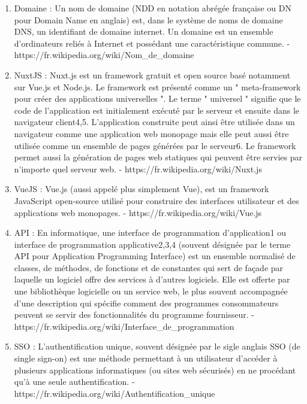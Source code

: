 \documentclass[12pt]{article}
\begin{document}
\begin {sloppypar}
\begin{enumerate}
    - https://fr.wikipedia.org/wiki/Google\_Cloud\_Platform
  \item 
    Domaine : Un nom de domaine (NDD en notation abrégée française ou DN pour Domain Name en anglais) est, dans le système de noms de domaine DNS, un identifiant de domaine internet. Un domaine est un ensemble d'ordinateurs reliés à Internet et possédant une caractéristique commune. 
    - https://fr.wikipedia.org/wiki/Nom\_de\_domaine
  \item 
    NuxtJS : Nuxt.js est un framework gratuit et open source basé notamment sur Vue.js et Node.js. Le framework est présenté comme un " meta-framework pour créer des applications universelles ". Le terme " universel " signifie que le code de l'application est initialement exécuté par le serveur et ensuite dans le navigateur client4,5. L'application construite peut ainsi être utilisée dans un navigateur comme une application web monopage mais elle peut aussi être utilisée comme un ensemble de pages générées par le serveur6. Le framework permet aussi la génération de pages web statiques qui peuvent être servies par n'importe quel serveur web. 
    - https://fr.wikipedia.org/wiki/Nuxt.js
  \item 
    VueJS : Vue.js (aussi appelé plus simplement Vue), est un framework JavaScript open-source utilisé pour construire des interfaces utilisateur et des applications web monopages.
    - https://fr.wikipedia.org/wiki/Vue.js
  \item 
    API : En informatique, une interface de programmation d’application1 ou interface de programmation applicative2,3,4 (souvent désignée par le terme API pour Application Programming Interface) est un ensemble normalisé de classes, de méthodes, de fonctions et de constantes qui sert de façade par laquelle un logiciel offre des services à d'autres logiciels. Elle est offerte par une bibliothèque logicielle ou un service web, le plus souvent accompagnée d'une description qui spécifie comment des programmes consommateurs peuvent se servir des fonctionnalités du programme fournisseur. 
    - https://fr.wikipedia.org/wiki/Interface\_de\_programmation 
  \item 
    SSO : L'authentification unique, souvent désignée par le sigle anglais SSO (de single sign-on) est une méthode permettant à un utilisateur d'accéder à plusieurs applications informatiques (ou sites web sécurisés) en ne procédant qu'à une seule authentification. 
    - https://fr.wikipedia.org/wiki/Authentification\_unique
  

\end{enumerate}
\newpage

\end{sloppypar}
\end{document}
